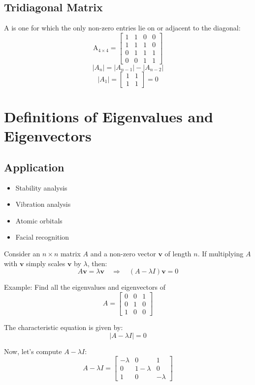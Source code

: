 \documentclass{article}
\begin{document}
\subsection{Tridiagonal Matrix}
A is one for which the only non-zero entries lie on or adjacent to the diagonal:
\[
\text{A}_{4 \times 4} = \begin{bmatrix}
    1 & 1 & 0 & 0 \\
    1 & 1 & 1 & 0 \\
    0 & 1 & 1 & 1 \\
    0 & 0 & 1 & 1 
\end{bmatrix}
\]
\[
|A_n| = |A_{n-1}| - |A_{n-2}|
\]
\[
|A_1| = \begin{bmatrix}
    1 & 1 \\
    1 & 1 
\end{bmatrix} = 0
\]

\section{Definitions of Eigenvalues and Eigenvectors}

\subsection{Application}
\begin{itemize}
    \item Stability analysis
    \item Vibration analysis
    \item Atomic orbitals
    \item Facial recognition
\end{itemize}

Consider an \( n \times n \) matrix \( A \) and a non-zero vector \( \mathbf{v} \) of length \( n \). If multiplying \( A \) with \( \mathbf{v} \) simply scales \( \mathbf{v} \) by \( \lambda \), then:
\[
A \mathbf{v} = \lambda \mathbf{v} \quad \Rightarrow \quad (A - \lambda I)\mathbf{v} = 0
\]

Example: Find all the eigenvalues and eigenvectors of
\[
A = \begin{bmatrix}
    0 & 0 & 1 \\
    0 & 1 & 0 \\
    1 & 0 & 0
\end{bmatrix}
\]

The characteristic equation is given by:
\[
|A - \lambda I| = 0
\]

Now, let's compute \( A - \lambda I \):
\[
A - \lambda I = \begin{bmatrix}
    -\lambda & 0 & 1 \\
    0 & 1 - \lambda & 0 \\
    1 & 0 & -\lambda
\end{bmatrix}
\]
\end{document}
